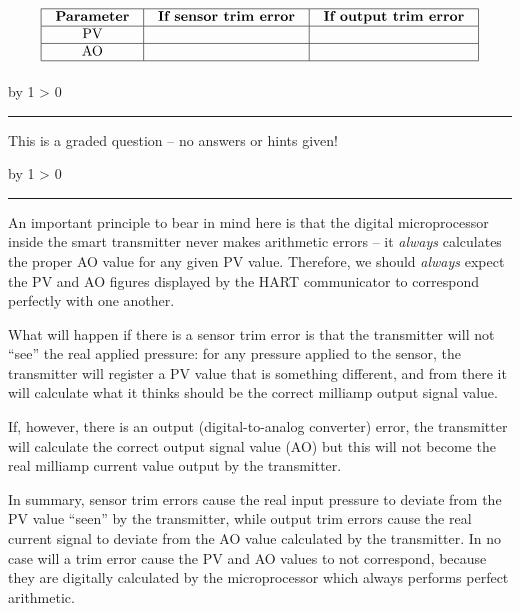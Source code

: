 \documentclass[12pt,a4paper]{article}
\def\svar{
           \advance\answnum by 1
           \ifnum \answnum > 0
                \hrule
                \vskip 3pt
                \leftline{Svar \the\answnum}
                \vskip 3pt \fi}
\def\notes{
           \advance\explnum by 1
           \ifnum \explnum > 0
                \hrule
                \vskip 3pt
                \leftline{Notes \the\explnum}
                \vskip 3pt \fi}
\begin{document}

$$\vbox{\offinterlineskip
\halign{\strut
\vrule \quad\hfil # \ \hfil & 
\vrule \quad\hfil # \ \hfil & 
\vrule \quad\hfil # \ \hfil \vrule \cr
\noalign{\hrule}
%
{\bf Parameter} & {\bf If sensor trim error} & {\bf If output trim error} \cr
%
\noalign{\hrule}
%
PV &  &  \cr
%
\noalign{\hrule}
%
AO &  &  \cr
%
\noalign{\hrule}
} %
}$$ %

\vfil 

\eject
\vskip 10pt \filbreak 





\svar{} 

This is a graded question -- no answers or hints given!

\vskip 10pt \filbreak 





\notes{} 


An important principle to bear in mind here is that the digital microprocessor inside the smart transmitter never makes arithmetic errors -- it {\it always} calculates the proper AO value for any given PV value.  Therefore, we should {\it always} expect the PV and AO figures displayed by the HART communicator to correspond perfectly with one another.

What will happen if there is a sensor trim error is that the transmitter will not ``see'' the real applied pressure: for any pressure applied to the sensor, the transmitter will register a PV value that is something different, and from there it will calculate what it thinks should be the correct milliamp output signal value.

If, however, there is an output (digital-to-analog converter) error, the transmitter will calculate the correct output signal value (AO) but this will not become the real milliamp current value output by the transmitter.

In summary, sensor trim errors cause the real input pressure to deviate from the PV value ``seen'' by the transmitter, while output trim errors cause the real current signal to deviate from the AO value calculated by the transmitter.  In no case will a trim error cause the PV and AO values to not correspond, because they are digitally calculated by the microprocessor which always performs perfect arithmetic.
\end{document}
